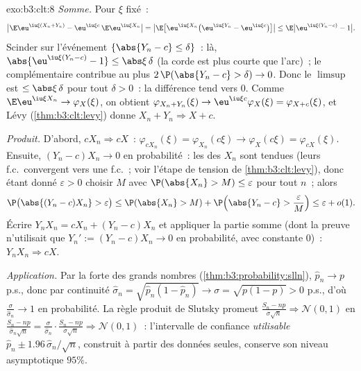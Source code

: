 \begin{solution}{exo:b3:clt:8}
\emph{Somme.} Pour $\xi$ fixé~:
\[
\bigl|\E\eu^{\iu\xi(X_n+Y_n)} -
\eu^{\iu\xi c}\,\E\eu^{\iu\xi X_n}\bigr|
= \bigl|\E\bigl[\eu^{\iu\xi X_n}\bigl(\eu^{\iu\xi Y_n} -
\eu^{\iu\xi c}\bigr)\bigr]\bigr|
\leq \E\bigl|\eu^{\iu\xi(Y_n - c)} - 1\bigr| .
\]
Scinder sur l'événement $\{\abs{Y_n - c} \leq \delta\}$~: là,
$\abs{\eu^{\iu\xi(Y_n-c)} - 1} \leq \abs\xi\,\delta$ (la corde
est plus courte que l'arc)~; le complémentaire contribue au
plus $2\,\P(\abs{Y_n - c} > \delta) \to 0$. Donc le
$\limsup$ est $\leq \abs\xi\,\delta$ pour tout $\delta >
0$~: la différence tend vers $0$. Comme $\E\eu^{\iu\xi X_n}
\to \varphi_X(\xi)$, on obtient $\varphi_{X_n+Y_n}(\xi) \to
\eu^{\iu\xi c}\varphi_X(\xi) = \varphi_{X+c}(\xi)$, et Lévy
(\cref{thm:b3:clt:levy}) donne $X_n + Y_n \Rightarrow X +
c$.

\emph{Produit.} D'abord, $cX_n \Rightarrow cX$~:
$\varphi_{cX_n}(\xi) = \varphi_{X_n}(c\xi) \to
\varphi_X(c\xi) = \varphi_{cX}(\xi)$. Ensuite, $(Y_n -
c)X_n \to 0$ en probabilité~: les  des $X_n$ sont
tendues (leurs f.c.\ convergent vers une f.c.~; voir l'étape
de tension de \cref{thm:b3:clt:levy}), donc étant donné
$\varepsilon > 0$ choisir $M$ avec $\P(\abs{X_n} > M) \leq
\varepsilon$ pour tout $n$~; alors
\[
\P\bigl(\abs{(Y_n - c)X_n} > \varepsilon\bigr) \leq
\P(\abs{X_n} > M) + \P\Bigl(\abs{Y_n - c} >
\frac{\varepsilon}{M}\Bigr) \leq \varepsilon + o(1) .
\]
Écrire $Y_nX_n = cX_n + (Y_n - c)X_n$ et appliquer la partie
somme (dont la preuve n'utilisait que $Y_n' := (Y_n -
c)X_n \to 0$ en probabilité, avec constante $0$)~: $Y_nX_n
\Rightarrow cX$.

\emph{Application.} Par la  forte des grands nombres
(\cref{thm:b3:probability:slln}), $\hat p_n \to p$ p.s.,
donc par continuité $\hat\sigma_n = \sqrt{\hat p_n(1 -
\hat p_n)} \to \sigma = \sqrt{p(1 - p)} > 0$ p.s., d'où
$\frac{\sigma}{\hat\sigma_n} \to 1$ en probabilité. La règle
produit de Slutsky promeut $\frac{S_n - np}{\sigma\sqrt n}
\Rightarrow \mathcal N(0,1)$ en $\frac{S_n -
np}{\hat\sigma_n\sqrt n} = \frac{\sigma}{\hat\sigma_n}\cdot
\frac{S_n - np}{\sigma\sqrt n} \Rightarrow \mathcal N(0,1)$~:
l'intervalle de confiance \emph{utilisable} $\hat p_n \pm
1.96\,\hat\sigma_n/\sqrt n$, construit à partir des
données seules, conserve son niveau asymptotique $95\%$.
\end{solution}

